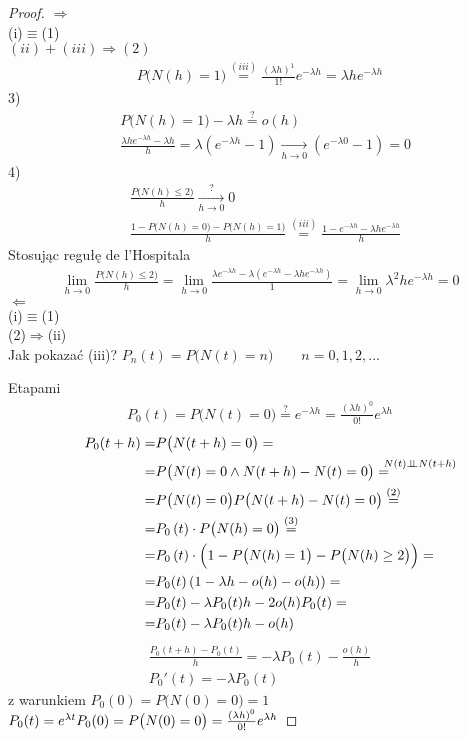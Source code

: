 \begin{proof}
{\Large $ \Rightarrow $}\\
(i)$ \equiv $(1)\\
$ (ii)+(iii)\Rightarrow(2) $\\
\begin{gather*}
P\bigl(N(h)=1\bigr)\stackrel{(iii)}{=}
\frac{(\lambda h)^1}{1!}e^{-\lambda h}=
\lambda he^{-\lambda h}
\end{gather*}
3)
\begin{align*}
&P\bigl(N(h)=1\bigr)-\lambda h\stackrel{?}{=}o(h)\\
&\frac{\lambda he^{-\lambda h}-\lambda h}{h}=
\lambda  \left(e^{-\lambda h}-1\right)\xrightarrow[h\to0]{}
\left(e^{-\lambda 0}-1\right)=0
\end{align*}
4)
\begin{align*}
&\frac{P\bigl(N(h)\le 2\bigr)}{h}\xrightarrow[h\to0]{?}0\\
&\frac{1-P\bigl(N(h)=0\bigr)-P\bigl(N(h)=1\bigr)}{h}\stackrel{(iii)}{=}
\frac{1-e^{-\lambda h}-\lambda he^{-\lambda h}}{h}
\end{align*}
Stosując regułę de l'Hospitala
\begin{gather*}
\lim\limits_{h\to0} \frac{P\bigl(N(h)\le 2\bigr)}{h}=
\lim\limits_{h\to0} \frac{\lambda  e^{-\lambda h }-\lambda  \left(e^{-\lambda h }-\lambda h  e^{-\lambda h }\right)}{1}=
\lim\limits_{h\to0} \lambda ^2 h e^{-\lambda h }=0
\end{gather*}
{\Large $ \Leftarrow $}\\
(i)$ \equiv $(1)\\
(2)$ \Rightarrow $(ii)\\
Jak pokazać (iii)? $ P_n(t)=P\bigl(N(t)=n\bigr) \qquad n=0,1,2,\dots $

Etapami
\begin{gather*}
P_0(t)=P\bigl(N(t)=0\bigr)\stackrel{?}{=}e^{-\lambda h}=\frac{(\lambda
 h)^0}{0!}e^{\lambda h}
\end{gather*}
\begin{align*}
P_0(t+h)=&
P\bigl(N(t+h)=0\bigr)
=\\=&
P\bigl(N(t)=0\wedge N(t+h)-N(t)=0\bigr)
\stackrel{\mathrlap{N(t)\Perp N(t+h)}}{=}\\=&
P\bigl(N(t)=0\bigr) P\bigl(N(t+h)-N(t)=0\bigr)
\stackrel{(2)}{=}\\=&
P_0\left(t\right)\cdot P\bigl(N(h)=0\bigr)
\stackrel{(3)}{=}\\=&
P_0\left(t\right)\cdot \Bigl(1-P\bigl(N(h)=1\bigr)-P\bigl(N(h)\ge 2\bigr)\Bigr)
=\\=&
P_0(t)\left(1-\lambda h-o(h)-o(h)\right)
=\\=&
P_0(t)-\lambda  P_0(t)h -2 o(h) P_0(t)
=\\=&
P_0(t)-\lambda  P_0(t)h - o(h)
\end{align*}
\begin{gather*}
\frac{P_0(t+h)-P_0(t)}{h}=
-\lambda P_0(t)- \frac{o(h)}{h}\\
P_0'(t)=-\lambda P_0(t)
\end{gather*}
z warunkiem $ P_0(0)=P\bigl(N(0)=0\bigr)=1 $\\
$ P_0(t)=e^{\lambda t} \\
P_0(0)=P\bigl(N(0)=0\bigr)=
\frac{(\lambda h)^0}{0!}e^{\lambda h}$
 

\end{proof}
